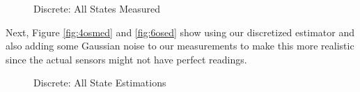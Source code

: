 \documentclass{article}
\begin{document}
\begin{figure}
\centering
{}
\caption{Discrete: All States Measured}
\end{figure}

Next, Figure \ref{fig:4osmed} and \ref{fig:6osed} show using our discretized estimator and also adding some Gaussian noise to our measurements to make this more realistic since the actual sensors might not have perfect readings.

\begin{figure}
\centering
{}
\caption{Discrete: All State Estimations}
\end{figure}
\end{document}
